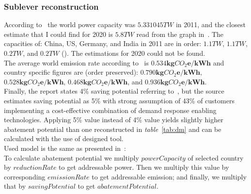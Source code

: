 \documentclass[11pt, twocolumn]{article}
\begin{document}
\subsubsection{Sublever reconstruction\label{sec:dm:reconstruction}}
According to~\citep{eia2011} the world power capacity was $5.331045 TW$ in 2011, and the closest estimate that I could find for 2020 is $5.8 TW$ read from the graph in~\citep{2002:iba}. The capacities of: China, US, Germany, and India in 2011 are in order: $1.1 TW$, $1.1 TW$, $0.2 TW$, and $0.2 TW$ (\citep{eia2011}). The estimations for 2020 could not be found.\\
The average world emission rate according to~\citep{iea2012co2} is $\mathbf{0.534 kg}CO_2\mathbf{e}/\mathbf{kWh}$ and country specific figures are (order preserved): $\mathbf{0.790 kg}CO_2\mathbf{e}/\mathbf{kWh}$, $\mathbf{0.528 kg}CO_2\mathbf{e}/\mathbf{kWh}$, $\mathbf{0.468 kg}CO_2\mathbf{e}/\mathbf{kWh}$, and $\mathbf{0.936 kg}CO_2\mathbf{e}/\mathbf{kWh}$.\\
Finally, the report states 4\% saving potential referring to~\citep{grid2008green}, but the source estimates saving potential as 5\% with strong assumption of 43\% of customers implementing a cost-effective combination of demand response enabling technologies. Applying 5\% value instead of 4\% value yields slightly higher abatement potential than one reconstructed in \emph{table}~\ref{tab:dm} and can be calculated with the use of designed tool.\\

Used model is the same as presented in~\citep{grid2008green}:\\
To calculate abatement potential we multiply $powerCapacity$ of selected country by $reductionRate$ to get addressable power. Then we multiply this value by corresponding $emissionRate$ to get addressable emission; and finally, we multiply that by $savingPotential$ to get $abatementPotential$.\\
\end{document}
